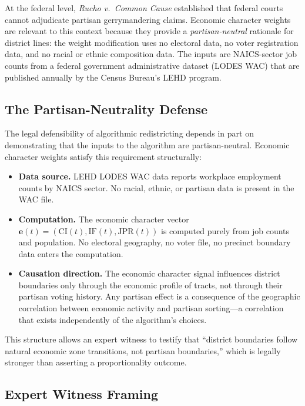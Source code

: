At the federal level, \textit{Rucho v.\ Common Cause} \citeyearpar{rucho2019}
established that federal courts cannot adjudicate partisan gerrymandering claims.
Economic character weights are relevant to this context because they provide
a \emph{partisan-neutral} rationale for district lines: the weight
modification uses no electoral data, no voter registration data, and no
racial or ethnic composition data.
The inputs are NAICS-sector job counts from a federal government
administrative dataset (LODES WAC) that are published annually by the
Census Bureau's LEHD program.

\subsection{The Partisan-Neutrality Defense}

The legal defensibility of algorithmic redistricting depends in part on
demonstrating that the inputs to the algorithm are partisan-neutral.
Economic character weights satisfy this requirement structurally:

\begin{itemize}
  \item \textbf{Data source.} LEHD LODES WAC data reports workplace
    employment counts by NAICS sector.
    No racial, ethnic, or partisan data is present in the WAC file.
  \item \textbf{Computation.} The economic character vector
    $\mathbf{e}(t) = (\mathrm{CI}(t), \mathrm{IF}(t), \mathrm{JPR}(t))$
    is computed purely from job counts and population.
    No electoral geography, no voter file, no precinct boundary data enters
    the computation.
  \item \textbf{Causation direction.} The economic character signal
    influences district boundaries only through the economic profile of
    tracts, not through their partisan voting history.
    Any partisan effect is a consequence of the geographic correlation
    between economic activity and partisan sorting---a correlation that
    exists independently of the algorithm's choices.
\end{itemize}

This structure allows an expert witness to testify that ``district boundaries
follow natural economic zone transitions, not partisan boundaries,'' which is
legally stronger than asserting a proportionality outcome.

\subsection{Expert Witness Framing}

